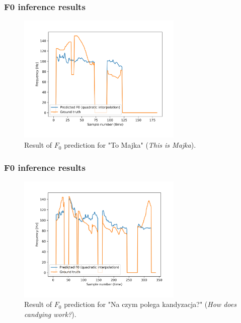 \documentclass[a4paper,9pt]{beamer}
\theoremstyle{mytheoremstyle}
\begin{document}
\begin{frame}
\frametitle{F0 inference results}
\begin{figure}
\begin{center}
  \includegraphics[width=0.7\textwidth]{res/amu_pl_ilo_BAZA_2006D_D1140_simple_pred_freq}
\end{center}
	\caption{Result of $F_0$ prediction for "To Majka" (\textit{This is Majka}).}
\end{figure}
\end{frame}

\begin{frame}
\frametitle{F0 inference results}
\begin{figure}
\begin{center}
  \includegraphics[width=0.7\textwidth]{res/amu_pl_ilo_BAZA_2006C_C0208_simple_pred_freq}
\end{center}
	\caption{Result of $F_0$ prediction for "Na czym polega kandyzacja?" (\textit{How does candying work?}).}
\end{figure}
\end{frame}

\end{document}
